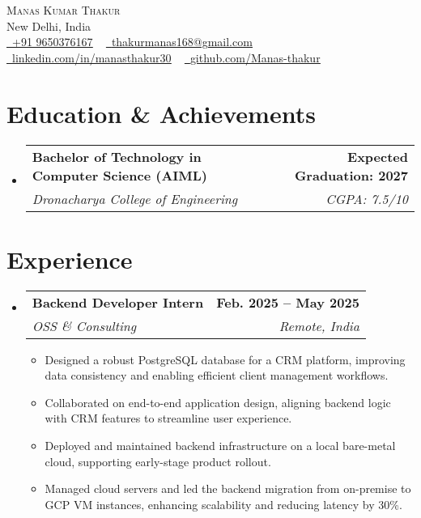 \documentclass[letterpaper,11pt]{article}
\makeatletter
\newcommand{\resumeItem}[1]{
  \item\small{
    {#1 \vspace{-2pt}}
  }
}
\newcommand{\resumeSubheading}[4]{
  \vspace{-2pt}\item
  \begin{tabular*}{1.0\textwidth}[t]{l@{\extracolsep{\fill}}r}
    \textbf{#1} & \textbf{\small #2} \\
    \textit{\small#3} & \textit{\small #4} \\
  \end{tabular*}\vspace{-7pt}
}
\newcommand{\resumeSubHeadingListStart}{\begin{itemize}[leftmargin=0.0in, label={}]}
\newcommand{\resumeSubHeadingListEnd}{\end{itemize}}
\newcommand{\resumeItemListStart}{\begin{itemize}}
\newcommand{\resumeItemListEnd}{\end{itemize}\vspace{-5pt}}
\makeatother
\begin{document}
\begin{center}
    {\Huge \scshape Manas Kumar Thakur} \\ \vspace{3pt}
    New Delhi, India \\ \vspace{3pt}
    \small 
    \href{tel:+919650376167}{\raisebox{-0.1\height}\faPhone\ \underline{+91 9650376167}} ~
    \href{mailto:thakurmanas168@gmail.com}{\raisebox{-0.2\height}\faEnvelope\ \underline{thakurmanas168@gmail.com}} ~
    \href{https://www.linkedin.com/in/manasthakur30}{\raisebox{-0.2\height}\faLinkedin\ \underline{linkedin.com/in/manasthakur30}} ~
    \href{https://github.com/Manas-thakur}{\raisebox{-0.2\height}\faGithub\ \underline{github.com/Manas-thakur}}
    \vspace{-8pt}
\end{center}

\section{Education \& Achievements}
\resumeSubHeadingListStart
  \resumeSubheading
    {Bachelor of Technology in Computer Science (AIML)}{Expected Graduation: 2027}
    {Dronacharya College of Engineering}{CGPA: 7.5/10}
\resumeSubHeadingListEnd

\section{Experience}
\resumeSubHeadingListStart
  \resumeSubheading
    {Backend Developer Intern}{Feb. 2025 -- May 2025}
    {OSS \& Consulting}{Remote, India}
    \resumeItemListStart
      \resumeItem{Designed a robust PostgreSQL database for a CRM platform, improving data consistency and enabling efficient client management workflows.}
      \resumeItem{Collaborated on end-to-end application design, aligning backend logic with CRM features to streamline user experience.}
      \resumeItem{Deployed and maintained backend infrastructure on a local bare-metal cloud, supporting early-stage product rollout.}
      \resumeItem{Managed cloud servers and led the backend migration from on-premise to GCP VM instances, enhancing scalability and reducing latency by 30\%.}
    \resumeItemListEnd
\resumeSubHeadingListEnd

\end{document}
